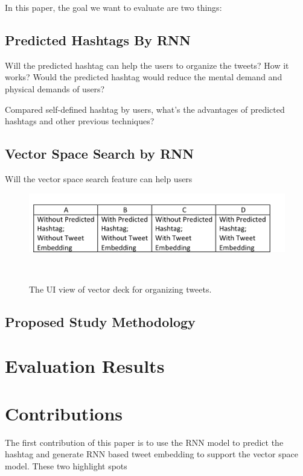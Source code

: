 In this paper, the goal we want to evaluate are two things:

\subsection{Predicted Hashtags By RNN}

Will the predicted hashtag can help the users to organize the tweets? How it works? Would the predicted hashtag would reduce the mental demand and physical demands of users?

Compared self-defined hashtag by users, what's the advantages of predicted hashtags and other previous techniques?


\subsection{Vector Space Search by RNN}

Will the vector space search feature can help users 

\begin{figure}[thb!]
    \includegraphics[width= 1.1 \columnwidth]{images/user_study_plan}
   \caption{The UI view of vector deck for organizing tweets.  } ~\label{fig: vector_deck}
\end{figure}


\subsection{Proposed Study Methodology}



\section{Evaluation Results}


\section{Contributions}

The first contribution of this paper is to use the RNN model to predict the hashtag and generate RNN based tweet embedding to support the vector space model. These two highlight spots 

